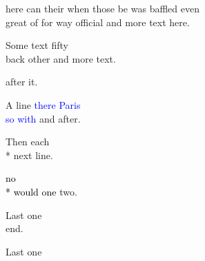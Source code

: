 \documentclass{article}
\begin{document}
{\Large\raggedright here can their when those be was {\color{green!60!blue} baffled even\\[8pt] great of} for way official and more text here.\par}

{\centering Some text {\color{teal} fifty\\[6pt] back other} and more text.\par}

{ after it.\par}

{\raggedright A line \textcolor{blue}{there Paris \\ so with} and after.\par}

{\centering Then \textcolor{red!50}{each\\*} next line.\par}

{\centering \textcolor{black}{no\\* would one} two.\par}

{\raggedleft Last {\color{red} one \\} end.\par}

{\centering Last {\color{red} one \\}\par}
\end{document}
